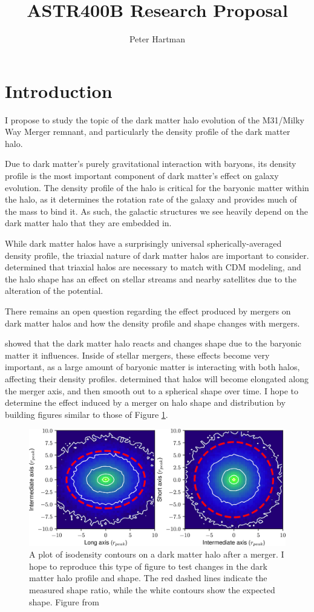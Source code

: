 \documentclass[linenumbers]{aastex631}
\begin{document}
\title{ASTR400B Research Proposal}

\author{Peter Hartman}

\section{Introduction} \label{sec:intro}
I propose to study the topic of the dark matter halo evolution of the M31/Milky Way Merger remnant, and particularly the density profile of the dark matter halo.

Due to dark matter's purely gravitational interaction with baryons, its density profile is the most important component of dark matter's effect on galaxy evolution. The density profile of the halo is critical for the baryonic matter within the halo, as it determines the rotation rate of the galaxy and provides much of the mass to bind it. As such, the galactic structures we see heavily depend on the dark matter halo that they are embedded in.

While dark matter halos have a surprisingly universal spherically-averaged density profile, the triaxial nature of dark matter halos are important to consider. \cite{Meneghetti} determined that triaxial halos are necessary to match with CDM modeling, and the halo shape has an effect on stellar streams and nearby satellites due to the alteration of the potential.

There remains an open question regarding the effect produced by mergers on dark matter halos and how the density profile and shape changes with mergers.

\cite{Abadi} showed that the dark matter halo reacts and changes shape due to the baryonic matter it influences. Inside of stellar mergers, these effects become very important, as a large amount of baryonic matter is interacting with both halos, affecting their density profiles. \cite{Despali} determined that halos will become elongated along the merger axis, and then smooth out to a spherical shape over time. I hope to determine the effect induced by a merger on halo shape and distribution by building figures similar to those of Figure \ref{fig:1}.


\begin{figure}[h!]
    \centering
    \includegraphics[width=\textwidth]{DrakosFig.jpg}
    \caption{A plot of isodensity contours on a dark matter halo after a merger. I hope to reproduce this type of figure to test changes in the dark matter halo profile and shape. The red dashed lines indicate the measured shape ratio, while the white contours show the expected shape. Figure from \cite{DrakosA}}
    \label{fig:1}
\end{figure}
\end{document}
